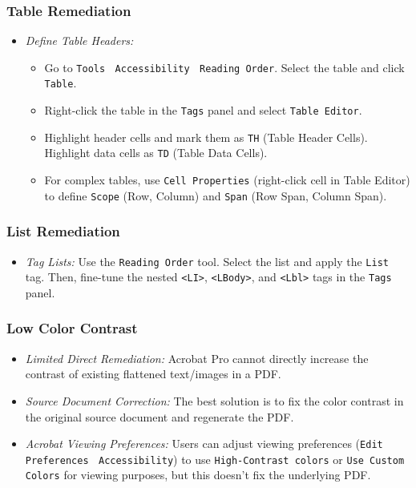 \subsubsection{Table Remediation}
\label{subsubsec:table-remediation}

\begin{itemize}
\item \emph{Define Table Headers:}
    \begin{itemize}
    \item Go to \texttt{Tools} $\>$ \texttt{Accessibility} $\>$ \texttt{Reading Order}. Select the table and click \texttt{Table}.
    \item Right-click the table in the \texttt{Tags} panel and select \texttt{Table Editor}.
    \item Highlight header cells and mark them as \texttt{TH} (Table Header Cells). Highlight data cells as \texttt{TD} (Table Data Cells).
    \item For complex tables, use \texttt{Cell Properties} (right-click cell in Table Editor) to define \texttt{Scope} (Row, Column) and \texttt{Span} (Row Span, Column Span).
    \end{itemize}
\end{itemize}

\subsubsection{List Remediation}
\label{subsubsec:list-remediation}
\begin{itemize}
\item \emph{Tag Lists:} Use the \texttt{Reading Order} tool. Select the list and apply the \texttt{List} tag. Then, fine-tune the nested \texttt{<LI>}, \texttt{<LBody>}, and \texttt{<Lbl>} tags in the \texttt{Tags} panel.
\end{itemize}
\subsubsection{Low Color Contrast}

\begin{itemize}
\item \emph{Limited Direct Remediation:} Acrobat Pro cannot directly increase the contrast of existing flattened text/images in a PDF.
\item \emph{Source Document Correction:} The best solution is to fix the color contrast in the original source document and regenerate the PDF.
\item \emph{Acrobat Viewing Preferences:} Users can adjust viewing preferences (\texttt{Edit} $\>$ \texttt{Preferences} $\>$ \texttt{Accessibility}) to use \texttt{High-Contrast colors} or \texttt{Use Custom Colors} for viewing purposes, but this doesn't fix the underlying PDF.
\end{itemize}

